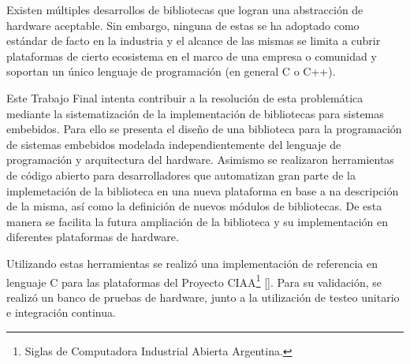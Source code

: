 Existen múltiples desarrollos de bibliotecas que logran una abstracción de hardware aceptable. Sin embargo, ninguna de estas se ha adoptado como estándar de facto en la industria y el alcance de las mismas se limita a cubrir plataformas de cierto ecosistema en el marco de una empresa o comunidad y soportan un único lenguaje de programación (en general C o C++).

Este Trabajo Final intenta contribuir a la resolución de esta problemática mediante la sistematización de la implementación de bibliotecas para sistemas embebidos. Para ello se presenta el diseño de una biblioteca para la programación de sistemas embebidos modelada independientemente del lenguaje de programación y arquitectura del hardware. Asimismo se realizaron herramientas de código abierto para desarrolladores que automatizan gran parte de la implemetación de la biblioteca en una nueva plataforma en base a na descripción de la misma, así como la definición de nuevos módulos de bibliotecas. De esta manera se facilita la futura ampliación de la biblioteca y su implementación en diferentes plataformas de hardware.		

Utilizando estas herramientas se realizó una implementación de referencia en lenguaje C para las plataformas del Proyecto CIAA\footnote{Siglas de Computadora Industrial Abierta Argentina.} []. Para su validación, se realizó un banco de pruebas de hardware, junto a la utilización de testeo unitario e integración continua.
